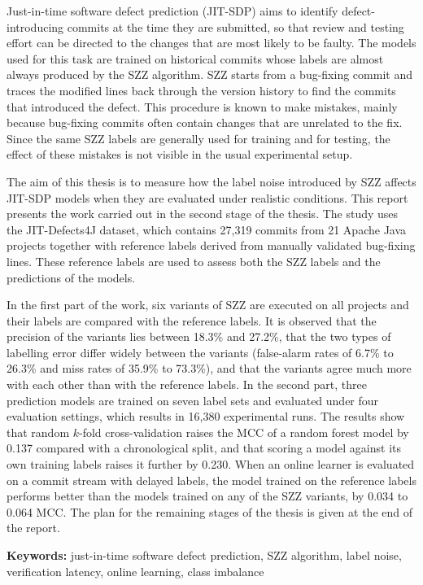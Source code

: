 \documentclass[12pt,a4paper,oneside]{report}
\begin{document}
Just-in-time software defect prediction (JIT-SDP) aims to identify
defect-introducing commits at the time they are submitted, so that review and
testing effort can be directed to the changes that are most likely to be
faulty. The models used for this task are trained on historical commits whose
labels are almost always produced by the SZZ algorithm. SZZ starts from a
bug-fixing commit and traces the modified lines back through the version
history to find the commits that introduced the defect. This procedure is known
to make mistakes, mainly because bug-fixing commits often contain changes that
are unrelated to the fix. Since the same SZZ labels are generally used for
training and for testing, the effect of these mistakes is not visible in the
usual experimental setup.

The aim of this thesis is to measure how the label noise introduced by SZZ
affects JIT-SDP models when they are evaluated under realistic conditions. This
report presents the work carried out in the second stage of the thesis. The study
uses the JIT-Defects4J dataset, which contains 27,319 commits from 21 Apache
Java projects together with reference labels derived from manually validated
bug-fixing lines. These reference labels are used to assess both the SZZ labels
and the predictions of the models.

In the first part of the work, six variants of SZZ are executed on all projects
and their labels are compared with the reference labels. It is observed that the
precision of the variants lies between 18.3\% and 27.2\%, that the two types of
labelling error differ widely between the variants (false-alarm rates of
6.7\% to 26.3\% and miss rates of 35.9\% to 73.3\%), and that the variants
agree much more with each other than with the reference labels. In the second
part, three prediction models are trained on seven label sets and evaluated
under four evaluation settings, which results in 16,380 experimental runs. The
results show that random $k$-fold cross-validation raises the MCC of a random
forest model by 0.137 compared with a chronological split, and that scoring a
model against its own training labels raises it further by 0.230. When an online
learner is evaluated on a commit stream with delayed labels, the model trained
on the reference labels performs better than the models trained on any of the
SZZ variants, by 0.034 to 0.064 MCC. The plan for the remaining stages of the
thesis is given at the end of the report.

\vspace{0.5em}
\noindent\textbf{Keywords:} just-in-time software defect prediction, SZZ
algorithm, label noise, verification latency, online learning, class imbalance
\end{document}
